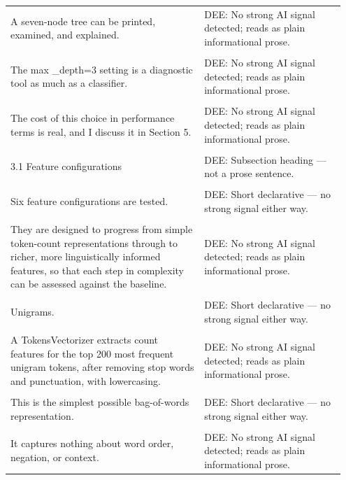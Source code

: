 \documentclass[11pt]{article}
\begin{document}
\begin{longtable}{|p{0.55\linewidth}|p{0.40\linewidth}|}
\hline
\rule{0pt}{3.5cm} & \\
\hline
A seven-node tree can be printed, examined, and explained. & DEE: No strong AI signal detected; reads as plain informational prose. \\[2pt]
\hline
\rule{0pt}{3.5cm} & \\
\hline
The max \_depth=3 setting is a diagnostic tool as much as a classifier. & DEE: No strong AI signal detected; reads as plain informational prose. \\[2pt]
\hline
\rule{0pt}{3.5cm} & \\
\hline
The cost of this choice in performance terms is real, and I discuss it in Section 5. & DEE: No strong AI signal detected; reads as plain informational prose. \\[2pt]
\hline
\rule{0pt}{3.5cm} & \\
\hline
3.1 Feature configurations & DEE: Subsection heading --- not a prose sentence. \\[2pt]
\hline
\rule{0pt}{3.5cm} & \\
\hline
Six feature configurations are tested. & DEE: Short declarative --- no strong signal either way. \\[2pt]
\hline
\rule{0pt}{3.5cm} & \\
\hline
They are designed to progress from simple token-count representations through to richer, more linguistically informed features, so that each step in complexity can be assessed against the baseline. & DEE: No strong AI signal detected; reads as plain informational prose. \\[2pt]
\hline
\rule{0pt}{3.5cm} & \\
\hline
Unigrams. & DEE: Short declarative --- no strong signal either way. \\[2pt]
\hline
\rule{0pt}{3.5cm} & \\
\hline
A TokensVectorizer extracts count features for the top 200 most frequent unigram tokens, after removing stop words and punctuation, with lowercasing. & DEE: No strong AI signal detected; reads as plain informational prose. \\[2pt]
\hline
\rule{0pt}{3.5cm} & \\
\hline
This is the simplest possible bag-of-words representation. & DEE: Short declarative --- no strong signal either way. \\[2pt]
\hline
\rule{0pt}{3.5cm} & \\
\hline
It captures nothing about word order, negation, or context. & DEE: No strong AI signal detected; reads as plain informational prose. \\[2pt]

\end{longtable}
\end{document}
